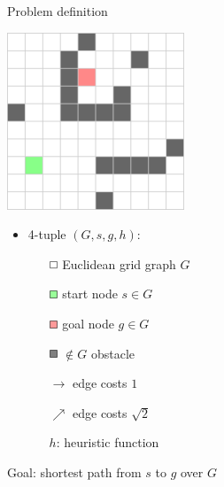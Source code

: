 \documentclass{presentation}
\newcommand{\rect}[1]{\tikz{\path[draw=black,fill=#1] (0,0) rectangle (2mm,2mm);}}
\newcommand{\grect}{\rect{white!60!green}}
\newcommand{\rrect}{\rect{white!60!red}}
\newcommand{\wrect}{\rect{white}}
\newcommand{\brect}{\rect{gray}}
\begin{document}
\begin{frame}{Problem definition}
	\begin{minipage}{0.3\textwidth}

	\includegraphics[width=\textwidth]{figures/gridgraph.png}

	\end{minipage}%
	\hfill%
	\begin{minipage}{0.6\textwidth}

	\begin{itemize}
		\item 4-tuple $(G, s, g, h)$:
		\pause
		\begin{itemize}
		\item[$\wrect$] Euclidean grid graph $G$
		\item[$\grect$] start node $s\in G$
		\item[$\rrect$] goal node $g\in G$
		\item[$\brect$] $\not\in G$ obstacle
		\pause
		\item[$\rightarrow$] edge costs $1$
		\item[$\nearrow$] edge costs $\sqrt{2}$
		\pause
		\item[$h$:] heuristic function
		\end{itemize}
	\end{itemize}

	\end{minipage}

	\hspace{3cm}

	\pause
	\begin{center}
		Goal: shortest path from $s$ to $g$ over $G$
	\end{center}

\end{frame}
\end{document}
